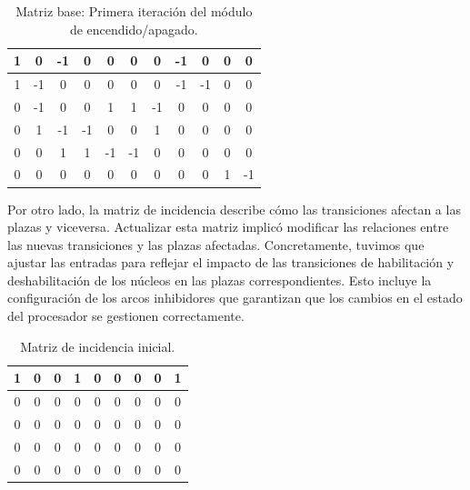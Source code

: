 \begin{table}[H]
    \centering
    \begin{tabular}{|c|c|c|c|c|c|c|c|c|c|c|}
        \hline
        1 & 0 & -1 & 0 & 0 & 0 & 0 & -1 & 0 & \cellcolor{lightgray}0 & \cellcolor{lightgray}0 \\
        \hline
        1 & -1 & 0 & 0 & 0 & 0 & 0 & -1 & -1 & \cellcolor{lightgray}0 & \cellcolor{lightgray}0 \\
        \hline
        0 & -1 & 0 & 0 & 1 & 1 & -1 & 0 & 0 & \cellcolor{lightgray}0 & \cellcolor{lightgray}0 \\
        \hline
        0 & 1 & -1 & -1 & 0 & 0 & 1 & 0 & 0 & \cellcolor{lightgray}0 & \cellcolor{lightgray}0 \\
        \hline
        0 & 0 & 1 & 1 & -1 & -1 & 0 & 0 & 0 & \cellcolor{lightgray}0 & \cellcolor{lightgray}0 \\
        \hline
        \cellcolor{lightgray}0 & \cellcolor{lightgray}0 & \cellcolor{lightgray}0 & \cellcolor{lightgray}0 & \cellcolor{lightgray}0 & \cellcolor{lightgray}0 & \cellcolor{lightgray}0 & \cellcolor{lightgray}0 & \cellcolor{lightgray}0 & \cellcolor{lightgray}1 & \cellcolor{lightgray}-1 \\
        \hline
    \end{tabular}
    \caption{Matriz base: Primera iteración del módulo de encendido/apagado.}
    \label{tabla:matriz_base_post}
\end{table}

Por otro lado, la matriz de incidencia describe cómo las transiciones afectan a las plazas y viceversa. Actualizar esta matriz implicó modificar las relaciones entre las nuevas transiciones y las plazas afectadas. Concretamente, tuvimos que ajustar las entradas para reflejar el impacto de las transiciones de habilitación y deshabilitación de los núcleos en las plazas correspondientes. Esto incluye la configuración de los arcos inhibidores que garantizan que los cambios en el estado del procesador se gestionen correctamente.\par

\renewcommand{\arraystretch}{1.5}
\setlength{\tabcolsep}{10pt}

\begin{table}[H]
    \centering
    \begin{tabular}{|c|c|c|c|c|c|c|c|c|}
        \hline
        1 & 0 & 0 & 1 & 0 & 0 & 0 & 0 & 1 \\
        \hline
        0 & 0 & 0 & 0 & 0 & 0 & 0 & 0 & 0 \\
        \hline
        0 & 0 & 0 & 0 & 0 & 0 & 0 & 0 & 0 \\
        \hline
        0 & 0 & 0 & 0 & 0 & 0 & 0 & 0 & 0 \\
        \hline
        0 & 0 & 0 & 0 & 0 & 0 & 0 & 0 & 0 \\
        \hline
    \end{tabular}
    \caption{Matriz de incidencia inicial.}
    \label{tabla:matriz_incidencia_pre}
\end{table}

